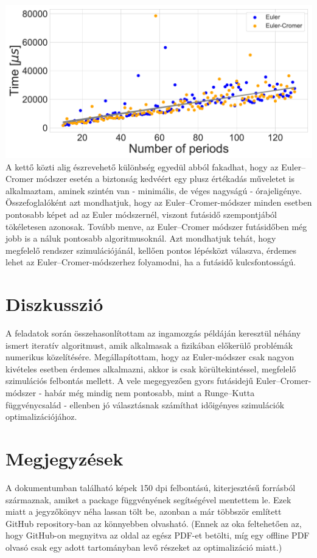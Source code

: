 \begin{multicols}{2}
\hfill \break \hfill \break
{\centering\includegraphics[width=.5\textwidth]{images/runtime_all_both.pdf}}
\hfill \break
A kettő közti alig észrevehető különbség egyedül abból fakadhat, hogy az Euler--Cromer módszer esetén a biztonság kedvéért egy plusz értékadás műveletet is alkalmaztam, aminek szintén van - minimális, de véges nagyságú - órajeligénye. \\
Összefoglalóként azt mondhatjuk, hogy az Euler--Cromer-módszer minden esetben pontosabb képet ad az Euler módszernél, viszont futásidő szempontjából tökéletesen azonosak. Tovább menve, az Euler--Cromer módszer futásidőben még jobb is a náluk pontosabb algoritmusoknál. Azt mondhatjuk tehát, hogy megfelelő rendszer szimulációjánál, kellően pontos lépésközt válaszva, érdemes lehet az Euler--Cromer-módszerhez folyamodni, ha a futásidő kulcsfontosságú.

\section{Diszkusszió} \label{sec:5}
A feladatok során összehasonlítottam az ingamozgás példáján keresztül néhány ismert iteratív algoritmust, amik alkalmasak a fizikában előkerülő problémák numerikus közelítésére. Megállapítottam, hogy az Euler-módszer csak nagyon kivételes esetben érdemes alkalmazni, akkor is csak körültekintéssel, megfelelő szimulációs felbontás mellett. A vele megegyezően gyors futásidejű Euler--Cromer-módszer - habár még mindig nem pontosabb, mint a Runge--Kutta függvénycsalád - ellenben jó választásnak számíthat időigényes szimulációk optimalizációjához.

\section{Megjegyzések} \label{sec:6}
A dokumentumban található képek 150 dpi felbontású,  kiterjesztésű forrásból származnak, amiket a  package  függvényének segítségével mentettem le. Ezek miatt a jegyzőkönyv néha lassan tölt be, azonban a már többször említett GitHub repository-ban az könnyebben olvasható. (Ennek az oka feltehetően az, hogy GitHub-on megnyitva az oldal az egész PDF-et betölti, míg egy offline PDF olvasó csak egy adott tartományban levő részeket az optimalizáció miatt.) \\

\end{multicols}